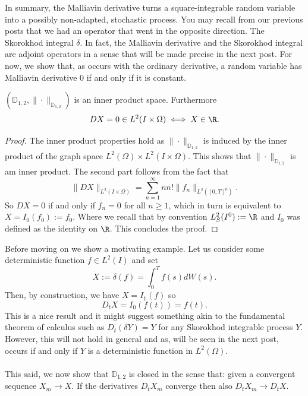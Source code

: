 \documentclass[
    a4paper,
    DIV=14,
    abstract=true,
    numbers=noenddot
]{scrartcl}
\begin{document}
In summary, the Malliavin derivative turns a square-integrable random variable into
a possibly non-adapted, stochastic process. You may recall from our previous posts that we had an operator that went in the opposite direction. The Skorokhod integral $\delta $. In fact, the Malliavin derivative and the Skorokhod integral are adjoint operators in a sense that will be made precise in the next post. For now, we show that, as occurs with the ordinary derivative, a random variable has Malliavin derivative $0$ if and only if it is constant.
\begin{corollary}\label{normedspace}
	$(\mathbb{D}_{1,2},\|\cdot \|_{\mathbb{D}_{1,2}})$ is an inner product space. Furthermore
	\begin{equation*}
		D X=0 \in L^2(I \times \Omega)\iff X\in \R.
	\end{equation*}
\end{corollary}
\begin{proof}
	The inner product properties hold as $ \|\cdot\|_{\mathbb{D}_{1,2}}$ is induced by the inner product of the graph space $L^2(\Omega) \times L^2(I \times \Omega)$. This shows that $\|\cdot \|_{\mathbb{D}_{1,2}}$ is am inner product. The second part follows from the fact that
	\begin{equation*}
		\|DX\|_{L^2(I \times \Omega)}=\sum_{n=1}^{\infty} n n!\|f_{n}\|_{L^2([0,T]^n)}.	\end{equation*}
	So $DX=0$ if and only if  $f_n=0$ for all $n\geq 1$, which in turn is equivalent to  $X=I_0(f_0):=f_0$. Where we recall that by convention $L^2_{S}(I^0):=\R$ and $I_0$ was defined as the identity on  $\R$.  This concludes the proof.
\end{proof}
Before moving on we show a motivating example. Let us consider some deterministic function $f\in L^2(I)$ and set $$X:=\delta(f)= \int_{0}^T f(s)dW(s).$$ Then, by construction, we have $X=I_1(f)$ so
\begin{equation*}
	D_t X= I_0(f(t))=f(t).
\end{equation*}
This is a nice result and it might suggest something akin to the fundamental theorem of calculus such as $D_t(\delta Y)=Y$ for any Skorokhod integrable process $Y$. However, this will not hold in general and as, will be seen in the next post, occurs if and only if $Y$ is a deterministic function in $L^2(\Omega)$.\\\\
This said, we now show that $\mathbb{D}_{1,2}$ is closed in the sense that: given a convergent sequence $X_m\to X$. If the derivatives  $D_tX_m$ converge then also $D_t X_m\to D_t X$.
\end{document}
